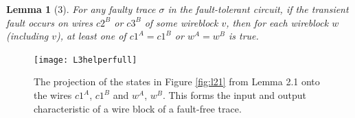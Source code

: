 \documentclass[12pt]{report}
\newtheorem*{lemma}{Lemma}
\begin{document}

\begin{lemma}[3]
For any faulty trace $\sigma$ in the fault-tolerant circuit, if the transient fault occurs on wires $c2^B$ or $c3^B$ of some wireblock $v$, then for each wireblock $w$ (including $v$), at least one of $c1^A=c1^B$ or $w^A=w^B$ is true.


\end{lemma}
\begin{figure}
\centering
\texttt{[image: L3helperfull]}
\caption[Fault-free transitions of $c1$ and $w$ wires]{The projection of the states in Figure \ref{fig:l21} from Lemma 2.1 onto the wires $c1^A$, $c1^B$ and $w^A$, $w^B$. This forms the input and output characteristic of a wire block of a fault-free trace.}
\label{fig:l3helper}
\end{figure}
\end{document}

